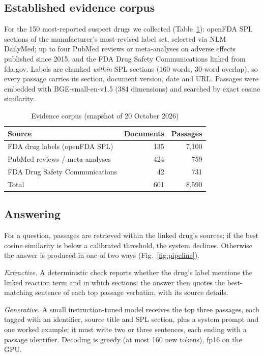 \documentclass[conference]{IEEEtran}
\begin{document}
\subsection{Established evidence corpus}
For the 150 most-reported suspect drugs we collected (Table~\ref{tab:corpus}): openFDA SPL sections of the manufacturer's most-revised label set, selected via NLM DailyMed; up to four PubMed reviews or meta-analyses on adverse effects published since 2015; and the FDA Drug Safety Communications linked from fda.gov. Labels are chunked \emph{within} SPL sections (160 words, 30-word overlap), so every passage carries its section, document version, date and URL. Passages were embedded with BGE-small-en-v1.5 (384 dimensions) \cite{xiao2023cpack} and searched by exact cosine similarity.

\begin{table}[t]
\caption{Evidence corpus (snapshot of 20 October 2026)}
\label{tab:corpus}
\centering
\begin{tabular}{lrr}
\toprule
Source & Documents & Passages \\
\midrule
FDA drug labels (openFDA SPL) & 135 & 7{,}100 \\
PubMed reviews / meta-analyses & 424 & 759 \\
FDA Drug Safety Communications & 42 & 731 \\
\midrule
Total & 601 & 8{,}590 \\
\bottomrule
\end{tabular}
\end{table}

\subsection{Answering}
For a question, passages are retrieved within the linked drug's sources; if the best cosine similarity is below a calibrated threshold, the system declines. Otherwise the answer is produced in one of two ways (Fig.~\ref{fig:pipeline}).

\emph{Extractive.} A deterministic check reports whether the drug's label mentions the linked reaction term and in which sections; the answer then quotes the best-matching sentence of each top passage verbatim, with its source details.

\emph{Generative.} A small instruction-tuned model receives the top three passages, each tagged with an identifier, source title and SPL section, plus a system prompt and one worked example; it must write two or three sentences, each ending with a passage identifier. Decoding is greedy (at most 160 new tokens), fp16 on the GPU.
\end{document}
